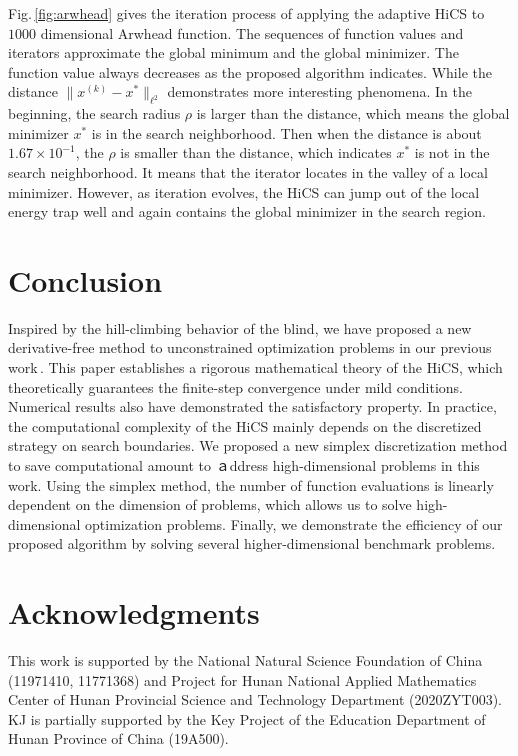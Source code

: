 \documentclass[mathpazo]{csam}
\theoremstyle{remark}
\begin{document}
Fig.\,\ref{fig:arwhead} gives the iteration process of
applying the adaptive HiCS to $1000$ dimensional Arwhead function.
The sequences of function values and iterators approximate the global minimum and the global minimizer. 
The function value always decreases as the proposed algorithm
indicates. While the distance $\|x^{(k)}-x^*\|_{\ell^2}$
demonstrates more interesting phenomena. In the beginning, the
search radius $\rho$ is larger than the distance, which means the global
minimizer $x^*$ is in the search neighborhood. Then when the distance is
about $1.67\times 10^{-1}$, the $\rho$ is smaller than the
distance, which indicates $x^*$ is not in the search neighborhood. 
It means that the iterator locates in the valley of a local minimizer. 
However, as iteration evolves, the HiCS can jump out of
the local energy trap well and again contains the global
minimizer in the search region.



\section{Conclusion}
\label{sec:conclusion}

Inspired by the hill-climbing behavior of the blind, we have
proposed a new derivative-free method to unconstrained
optimization problems in our previous work\,\cite{huang2017hill}. 
This paper establishes a rigorous mathematical theory of the HiCS, which
theoretically guarantees the finite-step convergence
under mild conditions. Numerical results also have demonstrated
the satisfactory property. 
In practice, the computational complexity of the HiCS mainly
depends on the discretized strategy on search boundaries.
We proposed a new simplex
discretization method to save computational amount to ａddress high-dimensional problems in this work. Using the
simplex method, the number of function evaluations is linearly
dependent on the dimension of problems,
which allows us to solve high-dimensional optimization problems. 
Finally, we demonstrate the efficiency of our proposed algorithm
by solving several higher-dimensional benchmark problems.


\section*{Acknowledgments}
This work is supported by the National Natural Science Foundation of China (11971410,
11771368) and Project for Hunan National Applied Mathematics Center of Hunan
Provincial Science and Technology Department (2020ZYT003).
KJ is partially supported by the Key Project of the Education Department of 
Hunan Province of China (19A500). 
\end{document}
